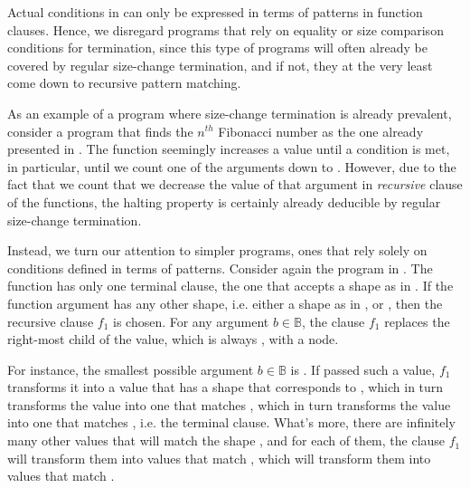 Actual conditions in \D{} can only be expressed in terms of patterns in
function clauses. Hence, we disregard programs that rely on equality or size
comparison conditions for termination, since this type of programs will often
already be covered by regular size-change termination, and if not, they at the
very least come down to recursive pattern matching.

As an example of a program where size-change termination is already prevalent,
consider a program that finds the $n^{th}$ Fibonacci number as the one already
presented in . The function 
seemingly increases a value until a condition is met, in particular, until we
count one of the arguments down to . However, due to the fact that we
count that we decrease the value of that argument in \emph{recursive} clause of
the  functions, the halting property is certainly already
deducible by regular size-change termination.

Instead, we turn our attention to simpler programs, ones that rely solely on
conditions defined in terms of patterns. Consider again the program in
. The function  has only one terminal
clause, the one that accepts a shape as in .
If the function argument has any other shape, i.e. either a shape as in
,  or
, then the recursive clause $f_1$ is
chosen. For any argument $b\in\mathbb{B}$, the clause $f_1$ replaces the
right-most child of the value, which is always , with a node.

For instance, the smallest possible argument $b\in\mathbb{B}$ is .  If
passed such a value, $f_1$ transforms it into a value that has a shape that
corresponds to , which in turn transforms
the value into one that matches , which in
turn transforms the value into one that matches
, i.e. the terminal clause. What's more,
there are infinitely many other values that will match the shape
, and for each of them, the clause $f_1$
will transform them into values that match
, which will transform them into values
that match .


